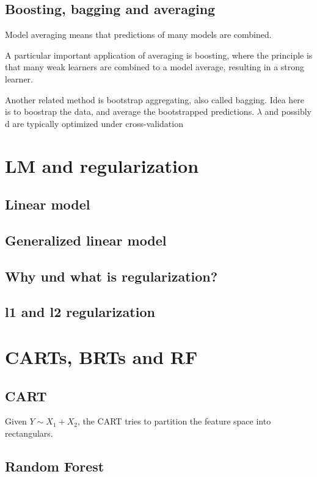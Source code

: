 \documentclass[a4paper,twoside]{tufte-book}\usepackage[]{graphicx}\usepackage[]{color}
\begin{document}
\subsection{Boosting, bagging and averaging}

Model averaging means that predictions of many models are combined. 

A particular important application of averaging is boosting, where the principle is that many weak learners are combined to a model average, resulting in a strong learner. 

Another related method is bootstrap aggregating, also called bagging. Idea here is to boostrap the data, and average the bootstrapped predictions. $\lambda$ and possibly d are typically optimized under cross-validation



\section{LM and regularization}

\subsection{Linear model}

\subsection{Generalized linear model}

\subsection{Why und what is regularization?}


\subsection{l1 and l2 regularization}


\section{CARTs, BRTs and RF}

\subsection{CART}
Given $Y \sim X_1 + X_2$, the CART tries to partition the feature space into rectangulars.

\subsection{Random Forest}
\citep[BRT,][]{Friedman2001}
\end{document}

